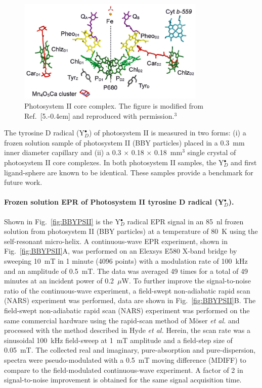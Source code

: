 \begin{figure}[htb]
\centering
\includegraphics[width=0.8\textwidth]{Kapitel/Ch5-Images/PSII_CORE.eps}
\caption[Photosystem II core complex.]{Photosystem II core complex. The figure is modified from Ref.~[5.\kern-0.4em] and reproduced with permission.$^3$}
\label{fig:psiicore}
\end{figure}

The tyrosine D radical (Y$_D^\bullet$) of photosystem II is measured in two forms: (i) a frozen solution sample of photosystem II (BBY particles) \cite{BBY1981} placed in a 0.3~mm inner diameter capillary and (ii) a 0.3 $\times$ 0.18 $\times$ 0.18~mm$^3$ single crystal of photosystem II core complexes. \cite{KERN2005147} In both photosystem II samples, the Y$_D^\bullet$ and first ligand-sphere are known to be identical. These samples provide a benchmark for future work.

\paragraph{Frozen solution EPR of Photosystem II tyrosine D radical (Y$_D^\bullet$).}
Shown in Fig.~\ref{fig:BBYPSII} is the Y$_D^\bullet$ radical EPR signal in an 85~nl frozen solution from photosystem II (BBY particles) at a temperature of 80~K using the self-resonant micro-helix. A continuous-wave EPR experiment, shown in Fig.~\ref{fig:BBYPSII}A, was performed on an Elexsys E580 X-band bridge by sweeping 10~mT in 1 minute (4096 points) with a modulation rate of 100~kHz and an amplitude of 0.5~mT. The data was averaged 49 times for a total of 49 minutes at an incident power of 0.2~$\mu$W. To further improve the signal-to-noise ratio of the continuous-wave experiment, a field-swept non-adiabatic rapid scan (NARS) experiment was performed, data are shown in Fig.~\ref{fig:BBYPSII}B. The field-swept non-adiabatic rapid scan (NARS) experiment was performed on the same commercial hardware using the rapid-scan method of M\"{o}ser {\em et al.}\cite{MOSER2017} and processed with the method described in Hyde {\em et al.}\cite{Hyde2013MDIFF} Herein, the scan rate was a sinusoidal 100~kHz field-sweep at 1~mT amplitude and a field-step size of 0.05~mT. The collected real and imaginary, pure-absorption and pure-dispersion, spectra were pseudo-modulated with a 0.5~mT moving difference (MDIFF)\cite{Hyde2013MDIFF} to compare to the field-modulated continuous-wave experiment. A factor of 2 in signal-to-noise improvement is obtained for the same signal acquisition time. 


